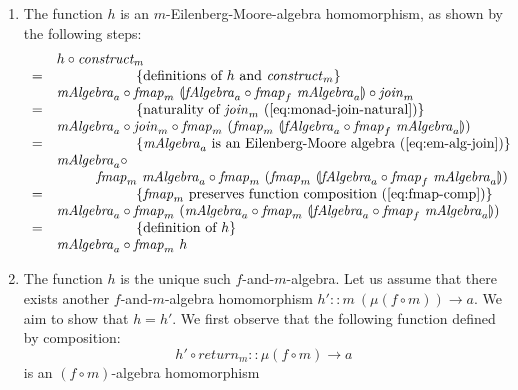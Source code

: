 \documentclass{jfp1}
\newcommand{\fold}[1]{\llparenthesis #1 \rrparenthesis}
\newcommand{\eqAnnotation}[1]{\hspace{2cm}\left\{\textrm{#1}\right\}}
\begin{document}
\begin{proof*}
\begin{enumerate}
  \item The function $h$ is an $m$-Eilenberg-Moore-algebra
    homomorphism, as shown by the following steps:
    \begin{displaymath}
      \begin{array}{cl}
        & h \circ \mathit{construct_m} \\
        =&\eqAnnotation{definitions of $h$ and $\mathit{construct}_m$} \\
         &\mathit{mAlgebra}_a \circ \mathit{fmap}_m~\fold{\mathit{fAlgebra}_a \circ \mathit{fmap}_f~\mathit{mAlgebra}_a} \circ \mathit{join}_m \\
        =&\eqAnnotation{naturality of $\mathit{join}_m$ (\autoref{eq:monad-join-natural})} \\
         &\mathit{mAlgebra}_a \circ \mathit{join}_m \circ \mathit{fmap}_m~(\mathit{fmap}_m~\fold{\mathit{fAlgebra}_a \circ \mathit{fmap}_f~\mathit{mAlgebra}_a}) \\
        =&\eqAnnotation{$\mathit{mAlgebra}_a$ is an Eilenberg-Moore algebra (\autoref{eq:em-alg-join})} \\
         &\mathit{mAlgebra}_a \circ \\
         &\hspace{1cm}\mathit{fmap}_m~\mathit{mAlgebra}_a \circ \mathit{fmap}_m~(\mathit{fmap}_m~\fold{\mathit{fAlgebra}_a \circ \mathit{fmap}_f~\mathit{mAlgebra}_a}) \\
        =&\eqAnnotation{$\mathit{fmap}_m$ preserves function composition (\autoref{eq:fmap-comp})} \\
         &\mathit{mAlgebra}_a \circ \mathit{fmap}_m~(\mathit{mAlgebra}_a \circ \mathit{fmap}_m~\fold{\mathit{fAlgebra}_a \circ \mathit{fmap}_f~\mathit{mAlgebra}_a}) \\
        =&\eqAnnotation{definition of $h$} \\
         &\mathit{mAlgebra}_a \circ \mathit{fmap}_m~h
      \end{array}
    \end{displaymath}
  \item The function $h$ is the unique such $f$-and-$m$-algebra. Let
    us assume that there exists another $f$-and-$m$-algebra
    homomorphism $h' :: m~(\mu(f \circ m)) \to a$. We aim to show that
    $h = h'$. We first observe that the following function defined by composition:
    \begin{displaymath}
      h' \circ \mathit{return}_m :: \mu(f \circ m) \to a
    \end{displaymath}
    is an $(f \circ m)$-algebra homomorphism

\end{enumerate}
\end{proof*}
\end{document}
